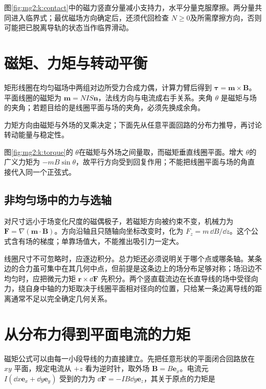 图\ref{fig:mg2:k:contact}中的磁力竖直分量减小支持力，水平分量克服摩擦。两分量共同进入临界式；最优磁场方向确定后，还须代回检查 $N\ge0$及所需摩擦方向，否则可能把已脱离导轨的状态当作临界滑动。


\section{磁矩、力矩与转动平衡}
矩形线圈在均匀磁场中两组对边所受力合成力偶，计算力臂后得到 $\bm\tau=\bm m\times\bm B$。平面线圈的磁矩为 $\bm m=NI S\bm n$，法线方向与电流成右手关系。夹角 $\theta$ 是磁矩与场的夹角；若题目给的是线圈平面与场的夹角，必须先换成余角。


力矩方向由磁矩与外场的叉乘决定；下面先从任意平面回路的分布力推导，再讨论转动能量与稳定性。

图\ref{fig:mg2:k:torque}的 $\theta$在磁矩与外场之间量取，而磁矩垂直线圈平面。增大 $\theta$的广义力矩为 $-mB\sin\theta$，故平行方向受到回复作用；不能把线圈平面与场的角直接代入同一个正弦式。


\subsection{非均匀场中的力与选轴}
对尺寸远小于场变化尺度的磁偶极子，若磁矩方向被约束不变，机械力为 $\bm F=\nabla(\bm m\cdot\bm B)$。方向沿轴且只随轴向坐标改变时，化为 $F_z=m\,\dd B/\dd z$。这个公式含有场的梯度；单靠场值大，不能推出吸引力一定大。


线圈尺寸不可忽略时，应逐边积分。总力矩还必须说明关于哪个点或哪条轴。某条边的合力虽可集中在其几何中点，但前提是这条边上的场分布足够对称；场沿边不均匀时，应把微元力矩 $\bm r\times\dd\bm F$ 先积分。两个竖直载流边在长直导线的场中受径向力，绕自身中轴的力矩取决于线圈平面相对径向的位置，只给某一条边离导线的距离通常不足以完全确定几何关系。

\section{从分布力得到平面电流的力矩}
磁矩公式可以由每一小段导线的力直接建立。先把任意形状的平面闭合回路放在 $xy$ 平面，规定电流从 $+z$ 看为逆时针，取外场 $\bm B=B\bm e_x$。电流元 $I(\dd x\bm e_x+\dd y\bm e_y)$ 受到的力为 $\dd\bm F=-IB\dd y\bm e_z$，其关于原点的力矩是

